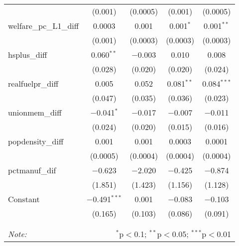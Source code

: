 \begin{table}[!htbp]
\begin{tabular}{@{\extracolsep{5pt}}lcccc}
  & (0.001) & (0.0005) & (0.001) & (0.0005) \\ 
  welfare\_pc\_L1\_diff & 0.0003 & 0.001 & 0.001$^{*}$ & 0.001$^{**}$ \\ 
  & (0.001) & (0.0003) & (0.0003) & (0.0003) \\ 
  hsplus\_diff & 0.060$^{**}$ & $-$0.003 & 0.010 & 0.008 \\ 
  & (0.028) & (0.020) & (0.020) & (0.024) \\ 
  realfuelpr\_diff & 0.005 & 0.052 & 0.081$^{**}$ & 0.084$^{***}$ \\ 
  & (0.047) & (0.035) & (0.036) & (0.023) \\ 
  unionmem\_diff & $-$0.041$^{*}$ & $-$0.017 & $-$0.007 & $-$0.011 \\ 
  & (0.024) & (0.020) & (0.015) & (0.016) \\ 
  popdensity\_diff & 0.001 & 0.001 & 0.0003 & 0.0001 \\ 
  & (0.0005) & (0.0004) & (0.0004) & (0.0004) \\ 
  pctmanuf\_dif & $-$0.623 & $-$2.020 & $-$0.425 & $-$0.874 \\ 
  & (1.851) & (1.423) & (1.156) & (1.128) \\ 
  Constant & $-$0.491$^{***}$ & 0.001 & $-$0.083 & $-$0.103 \\ 
  & (0.165) & (0.103) & (0.086) & (0.091) \\ 
 \hline \\[-1.8ex] 
\hline 
\hline \\[-1.8ex] 
\textit{Note:}  & \multicolumn{4}{r}{$^{*}$p$<$0.1; $^{**}$p$<$0.05; $^{***}$p$<$0.01} \\ 
\end{tabular} 
\end{table} 
